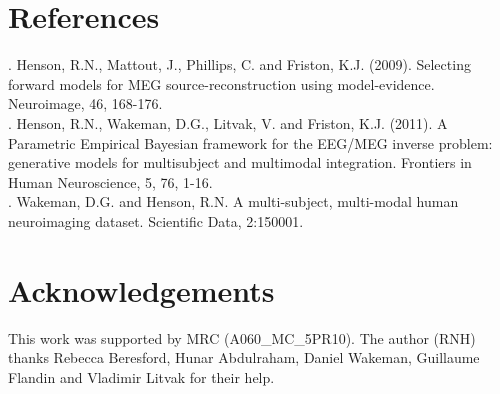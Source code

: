 \section{References}

. Henson, R.N., Mattout, J., Phillips, C. and Friston, K.J. (2009). Selecting forward models for MEG source-reconstruction using model-evidence. Neuroimage, 46, 168-176. \\
. Henson, R.N., Wakeman, D.G., Litvak, V. and Friston, K.J. (2011). A Parametric Empirical Bayesian framework for the EEG/MEG inverse problem: generative models for multisubject and multimodal integration. Frontiers in Human Neuroscience, 5, 76, 1-16. \\
. Wakeman, D.G. and Henson, R.N. A multi-subject, multi-modal human neuroimaging dataset. Scientific Data, 2:150001. \\

\section{Acknowledgements}
This work was supported by MRC (A060\_MC\_5PR10). The author (RNH) thanks Rebecca Beresford, Hunar Abdulraham, Daniel Wakeman, Guillaume Flandin and Vladimir Litvak for their help.
